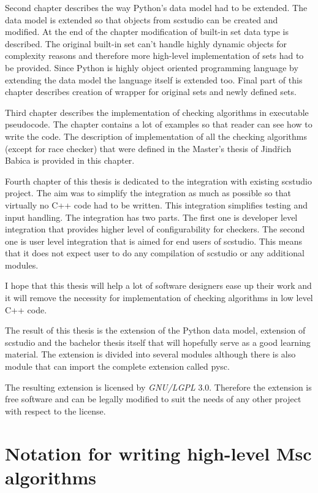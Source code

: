 \documentclass[11pt,oneside]{fithesis2}
\begin{document}
Second chapter describes the way Python's data model had to be extended. The data model is extended so that objects from scstudio can be created and modified. At the end of the chapter modification of built-in set data type is described. The original built-in set can't handle highly dynamic objects for complexity reasons and therefore more high-level implementation of sets had to be provided. Since Python is highly object oriented programming language by extending the data model the language itself is extended too. Final part of this chapter describes creation of wrapper for original sets and newly defined sets.

Third chapter describes the implementation of checking algorithms in executable pseudocode. The chapter contains a lot of examples so that reader can see how to write the code. The description of implementation of all the checking algorithms (except for race checker) that were defined in the Master's thesis of Jindřich Babica\cite{babica} is provided in this chapter.

Fourth chapter of this thesis is dedicated to the integration with existing scstudio project. The aim was to simplify the integration as much as possible so that virtually no C++ code had to be written. This integration simplifies testing and input handling. The integration has two parts. The first one is developer level integration that provides higher level of configurability for checkers. The second one is user level integration that is aimed for end users of scstudio. This means that it does not expect user to do any compilation of scstudio or any additional modules.

I hope that this thesis will help a lot of software designers ease up their work and it will remove the necessity for implementation of checking algorithms in low level C++ code.

The result of this thesis is the extension of the Python data model, extension of scstudio and the bachelor thesis itself that will hopefully serve as a good learning material. The extension is divided into several modules although there is also module that can import the complete extension called pysc.

The resulting extension is licensed by \textit{GNU/LGPL} 3.0\cite{lgpl}. Therefore the extension is free software and can be legally modified to suit the needs of any other project with respect to the license.

\chapter{Notation for writing high-level Msc algorithms}
\end{document}
